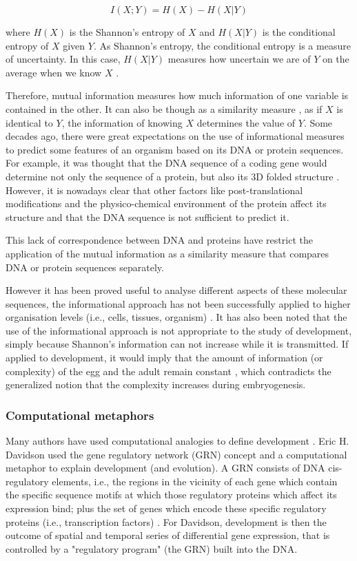  $$I(X;Y) = H(X) - H(X|Y)$$

where $H(X)$ is the Shannon's entropy of $X$ and $H(X|Y)$ is the conditional entropy of $X$ given $Y$. As Shannon's entropy, the conditional entropy is a measure of uncertainty. In this case, $H(X|Y)$ measures how uncertain we are of $Y$ on the average when we know $X$ \citep{Shannon1948}.

Therefore, mutual information measures how much information of one variable is contained in the other. It can also be though as a similarity measure \citep{yockey2005information}, as if $X$ is identical to $Y$, the information of knowing $X$ determines the value of $Y$.
Some decades ago, there were great expectations on the use of informational measures to predict some features of an organism based on its DNA or protein sequences. For example, it was thought that the DNA sequence of a coding gene would determine not only the sequence of a protein, but also its 3D folded structure \citep{Anfinsen1973}.
However, it is nowadays clear that other factors like post-translational modifications and the physico-chemical environment of the protein affect its structure \citep{Kang2009} and that the DNA sequence is not sufficient to predict it.

This lack of correspondence between DNA and proteins have restrict the application of the mutual information as a similarity measure that compares DNA \citep{Lichtenstein2015} or protein sequences \citep{Gloor2005} separately.

However it has been proved useful to analyse different aspects of these molecular sequences, the informational approach has not been successfully applied to higher organisation levels (i.e., cells, tissues, organism) \citep{Longo2012}. It has also been noted \citep{Jaeger2014devmech} that the use of the informational approach is not appropriate to the study of development, simply because Shannon's information can not 
increase while it is transmitted. If applied to development, it would imply that the amount of information (or complexity) of the egg and the adult remain constant \citep{Jaeger2014devmech}, which contradicts the generalized notion that the complexity increases during embryogenesis.
 

\subsubsection{Computational metaphors}
Many authors have used computational analogies to define development \citep{Apter1965,monod2012cytodifferentiation,mayr1997evolution,Davidson2001}. Eric H. Davidson used the gene regulatory network (GRN) concept and a computational metaphor to explain development (and evolution). A GRN consists of DNA cis-regulatory elements, i.e., the regions in the vicinity of each gene which contain the specific sequence motifs at which those regulatory proteins which affect its expression bind; plus the set of genes which encode these specific regulatory proteins (i.e., transcription factors) \citep{Davidson2001}. For Davidson, development is then the outcome of spatial and temporal series of differential gene expression, that is controlled by a "regulatory program" (the GRN) built into the DNA.

